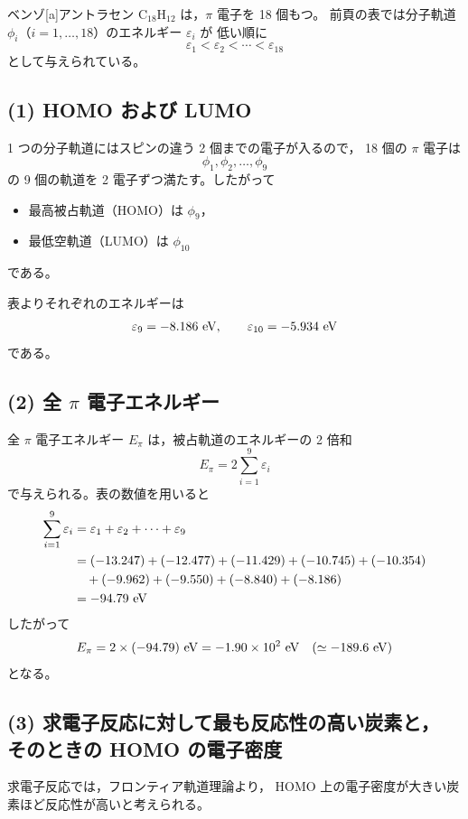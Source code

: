 \documentclass[a4paper,12pt]{jlreq}
\begin{document}
ベンゾ[a]アントラセン C$_{18}$H$_{12}$ は，$\pi$ 電子を 18 個もつ。
前頁の表では分子軌道 $\phi_i$（$i=1,\dots ,18$）のエネルギー $\varepsilon_i$ が
低い順に
\[
\varepsilon_1<\varepsilon_2<\cdots<\varepsilon_{18}
\]
として与えられている。

\subsection*{(1) HOMO および LUMO}

1 つの分子軌道にはスピンの違う 2 個までの電子が入るので，
18 個の $\pi$ 電子は
\[
\phi_1,\phi_2,\dots,\phi_9
\]
の 9 個の軌道を 2 電子ずつ満たす。したがって
\begin{itemize}
  \item 最高被占軌道（HOMO）は $\phi_9$，
  \item 最低空軌道（LUMO）は $\phi_{10}$
\end{itemize}
である。

表よりそれぞれのエネルギーは
\[
\varepsilon_9 = -8.186\ {\rm eV},\qquad
\varepsilon_{10} = -5.934\ {\rm eV}
\]
である。

\subsection*{(2) 全 $\pi$ 電子エネルギー}

全 $\pi$ 電子エネルギー $E_\pi$ は，被占軌道のエネルギーの 2 倍和
\[
E_\pi = 2\sum_{i=1}^{9} \varepsilon_i
\]
で与えられる。表の数値を用いると
\begin{align*}
\sum_{i=1}^{9}\varepsilon_i
&=\varepsilon_1+\varepsilon_2+\cdots+\varepsilon_9 \\
&= (-13.247)+(-12.477)+(-11.429)+(-10.745)+(-10.354) \\
&\hspace{1em} +(-9.962)+(-9.550)+(-8.840)+(-8.186) \\
&= -94.79\ {\rm eV}
\end{align*}
したがって
\[
E_\pi = 2\times (-94.79)\ {\rm eV}
      = -1.90\times 10^2\ {\rm eV}\quad(\simeq -189.6\ {\rm eV})
\]
となる。

\subsection*{(3) 求電子反応に対して最も反応性の高い炭素と，
そのときの HOMO の電子密度}

求電子反応では，フロンティア軌道理論より，
HOMO 上の電子密度が大きい炭素ほど反応性が高いと考えられる。
\end{document}
